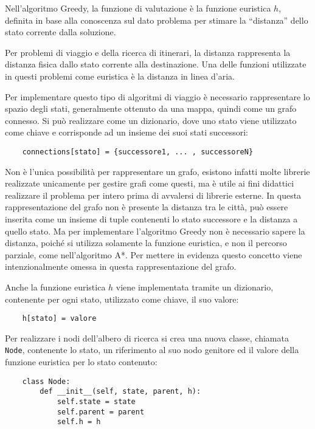\documentclass{article}
\numberwithin{equation}{subsection}
\begin{document}
Nell'algoritmo Greedy, la funzione di valutazione è la funzione euristica $h$, definita in 
base alla conoscenza sul dato problema per stimare la ``distanza'' dello stato corrente dalla soluzione. 

Per problemi di viaggio e della ricerca di itinerari, la distanza rappresenta la distanza fisica 
dallo stato corrente alla destinazione. Una delle funzioni utilizzate in questi problemi come 
euristica è la distanza in linea d'aria. 

Per implementare questo tipo di algoritmi di viaggio è necessario rappresentare lo spazio degli 
stati, generalmente ottenuto da una mappa, quindi come un grafo connesso. Si può realizzare 
come un dizionario, dove uno stato viene utilizzato come chiave e corrisponde ad un insieme 
dei suoi stati successori:
\begin{verbatim}
    connections[stato] = {successore1, ... , successoreN}
\end{verbatim}

Non è l'unica possibilità per rappresentare un grafo, esistono infatti molte librerie 
realizzate unicamente per gestire grafi come questi, ma è utile ai fini didattici realizzare 
il problema per intero prima di avvalersi di librerie esterne. 
In questa rappresentazione del grafo non è presente la distanza tra le città, può essere inserita 
come un insieme di tuple contenenti lo stato successore e la distanza a quello stato. 
Ma per implementare l'algoritmo Greedy non è necessario sapere la distanza, poiché si utilizza 
solamente la funzione euristica, e non il percorso parziale, come nell'algoritmo A*. 
Per mettere in evidenza questo concetto viene intenzionalmente omessa in questa rappresentazione 
del grafo. 

Anche la funzione euristica $h$ viene implementata tramite un dizionario, contenente per ogni 
stato, utilizzato come chiave, il suo valore:
\begin{verbatim}
    h[stato] = valore
\end{verbatim}

Per realizzare i nodi dell'albero di ricerca si crea una nuova classe, chiamata \verb|Node|, 
contenente lo stato, un riferimento 
al suo nodo genitore ed il valore della funzione euristica per lo stato contenuto:
\begin{verbatim}
    class Node:
        def __init__(self, state, parent, h):
            self.state = state
            self.parent = parent
            self.h = h
\end{verbatim}
\end{document}
